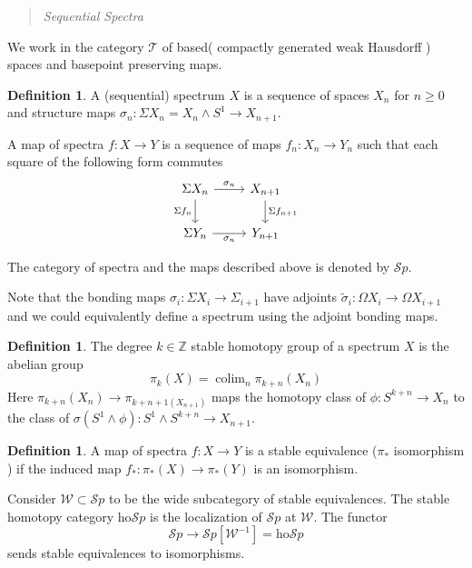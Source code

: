 \documentclass[notitlepage,12pt]{article}
\title {}
\date{}
\theoremstyle{definition}
\newtheorem{definition}[theorem]{Definition}
\theoremstyle{para}{\normalfont}
\DeclareMathOperator{\colim}{colim}
\begin{document}
\begin{abstract}\color{brown}
    \textit{Sequential Spectra}
\end{abstract}

We work in the category $\mathcal{T}$ of based( compactly generated weak Hausdorff ) spaces  and basepoint preserving maps. 
\begin{definition}
    A (sequential) spectrum $X$ is a sequence of spaces $X_n$ for $n\geq 0$ and structure maps $\sigma_n:\Sigma X_n=X_n\wedge S^1\to X_{n+1 }$. 
  
    A map of spectra $f:X\to Y$ is a sequence of maps $f_n:X_n\to Y_n$ such that each square of the following form commutes 
    \[
        \begin{tikzcd}
\Sigma X_n \arrow[r, "\sigma_n"] \arrow[d, "\Sigma f_n"'] & X_{n+1} \arrow[d, "\Sigma f_{n+1}"] \\
\Sigma Y_n \arrow[r, "\sigma_n"']                         & Y_{n+1}                            
\end{tikzcd}
    \]

    The category of spectra and the maps described above is denoted by $\mathcal{S}p$.
\end{definition}
Note that the bonding maps $\sigma_i:\Sigma X_i\to \Sigma_{i+1 }$ have adjoints $\tilde{\sigma}_i:\Omega X_i\to \Omega X_{i+1}$ and we could equivalently define a spectrum using the adjoint bonding maps. 

\begin{definition}
    The degree $k\in \mathbb{Z}$ stable homotopy group of a spectrum $X$ is the abelian group 
    \[
        \pi_k(X)=\colim_n \pi_{k+n}(X_n)
    \]Here $\pi_{k+n }(X_n)\to \pi_{k+n+1 (X_{n+1})}$ maps the homotopy class of $\phi:S^{k+n } \to X_n$ to the class of $\sigma(S^1\wedge \phi):S^1\wedge S^{k+n } \to X_{n+1 }$.
\end{definition}

\begin{definition}
    A map of spectra $f:X\to Y$ is a stable equivalence ($\pi_*$ isomorphism ) if the induced map $f_*:\pi_*(X)\to \pi_*(Y)$ is an isomorphism. 
\end{definition}

Consider $\mathcal{W}\subset \mathcal{S}p$ to be the wide subcategory of stable equivalences. The stable homotopy category $\mathrm{ho } \mathcal{S}p$ is the localization of $\mathcal{S}p$ at $\mathcal{W}$. The functor 
\[
    \mathcal{S}p\to \mathcal{S}p[\mathcal{W}^{-1 } ]=\mathrm{ho } \mathcal{S}p
\] sends stable equivalences to isomorphisms. 
\end{document}
